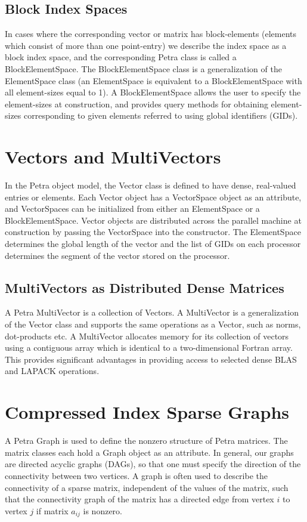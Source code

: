 \documentclass[12pt,relax]{PetraObjectModel}
\begin{document}
\subsection{Block Index Spaces}
In cases where the corresponding vector or matrix has block-elements (elements
which consist of more than one point-entry) we describe the index space as a
block index space, and the corresponding Petra class is called a
BlockElementSpace. The BlockElementSpace class is a generalization of the
ElementSpace class (an ElementSpace is equivalent to a
BlockElementSpace with all element-sizes equal to 1). A BlockElementSpace
 allows the user to
specify the element-sizes at construction, and provides query methods for
obtaining element-sizes corresponding to given elements referred to using
global identifiers (GIDs).

\section{Vectors and MultiVectors}
In the Petra object model, the Vector class is defined to have dense,
real-valued entries or elements. Each Vector object has a VectorSpace object
as an attribute, and VectorSpaces can be initialized from either an
ElementSpace or a BlockElementSpace.  Vector objects are distributed across the 
parallel machine at construction by passing the VectorSpace into the
 constructor.
The ElementSpace determines the global length of the vector 
and the list of GIDs on each processor 
determines the segment of the vector stored on the processor.

\subsection{MultiVectors as Distributed Dense Matrices}
A Petra MultiVector is a collection of Vectors. A MultiVector is a
generalization of the Vector class and supports the
same operations as a Vector, such as norms, dot-products etc. A MultiVector
allocates memory for its collection of vectors using a contiguous array which
is identical to a two-dimensional Fortran array. This provides significant
advantages in providing access to selected dense BLAS and LAPACK operations.

\section{Compressed Index Sparse Graphs}
A Petra Graph is used to define the nonzero structure of Petra matrices. The
matrix classes each hold a Graph object as an attribute.
In general, our graphs are directed acyclic graphs (DAGs), so that one must
specify the direction of the connectivity between two vertices.  A graph is
often used to describe the connectivity of a sparse matrix, independent of
the values of the matrix, such that the connectivity graph of the matrix has
a directed edge from vertex $i$ to vertex $j$ if matrix $a_{ij}$ is nonzero.
\end{document}
